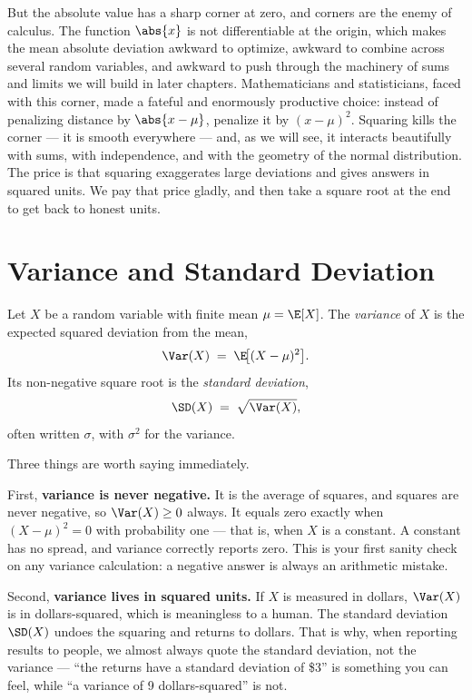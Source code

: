 But the absolute value has a sharp corner at zero, and corners are the enemy
of calculus. The function $\abs{x}$ is not differentiable at the origin,
which makes the mean absolute deviation awkward to optimize, awkward to
combine across several random variables, and awkward to push through the
machinery of sums and limits we will build in later chapters. Mathematicians
and statisticians, faced with this corner, made a fateful and enormously
productive choice: instead of penalizing distance by $\abs{x-\mu}$, penalize
it by $(x-\mu)^2$. Squaring kills the corner --- it is smooth everywhere ---
and, as we will see, it interacts beautifully with sums, with independence,
and with the geometry of the normal distribution. The price is that squaring
exaggerates large deviations and gives answers in squared units. We pay that
price gladly, and then take a square root at the end to get back to honest
units.

\section{Variance and Standard Deviation}
\label{ch09:defn}

\begin{definition}[Variance]
\label{ch09:def-var}
Let $X$ be a random variable with finite mean $\mu = \E[X]$. The
\emph{variance} of $X$ is the expected squared deviation from the mean,
\[
  \Var(X) \;=\; \E\!\big[(X-\mu)^2\big].
\]
Its non-negative square root is the \emph{standard deviation},
\[
  \SD(X) \;=\; \sqrt{\Var(X)},
\]
often written $\sigma$, with $\sigma^2$ for the variance.
\end{definition}

Three things are worth saying immediately.

First, \textbf{variance is never negative.} It is the average of squares, and
squares are never negative, so $\Var(X) \ge 0$ always. It equals zero
exactly when $(X-\mu)^2 = 0$ with probability one --- that is, when $X$ is a
constant. A constant has no spread, and variance correctly reports zero. This
is your first sanity check on any variance calculation: a negative answer is
always an arithmetic mistake.

Second, \textbf{variance lives in squared units.} If $X$ is measured in
dollars, $\Var(X)$ is in dollars-squared, which is meaningless to a human. The
standard deviation $\SD(X)$ undoes the squaring and returns to dollars. That
is why, when reporting results to people, we almost always quote the standard
deviation, not the variance --- ``the returns have a standard deviation of
\$3'' is something you can feel, while ``a variance of 9 dollars-squared'' is
not.

